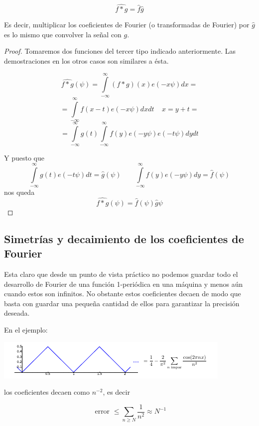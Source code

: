 \begin{prop}
	\[\widehat{f*g} = \hat{f} \hat{g}\]

	Es decir, multiplicar los coeficientes de Fourier (o transformadas de Fourier) por $\hat{g}$ es lo mismo que convolver la señal con $g$.

\end{prop}

\begin{proof}
Tomaremos dos funciones del tercer tipo indicado anteriormente. Las demostraciones en los otros casos son similares a ésta.

$$ \widehat{f*g}(\psi) = \int\limits^{\infty}_{-\infty} (f*g)(x) e(-x\psi)dx =$$
$$ = \int\limits^{\infty}_{-\infty} f(x - t) e (-x \psi) dx dt \;\;\;\; x = y + t=$$
$$ = \int\limits^{\infty}_{-\infty} g(t) \int\limits^{\infty}_{-\infty} f(y) e (-y \psi) e(-t\psi)dy dt$$

Y puesto que
$$ \int\limits^{\infty}_{-\infty} g(t) e(-t\psi) dt = \hat{g}(\psi) \;\;\;\;\;\;\; \int\limits^{\infty}_{-\infty} f(y) e (-y \psi) dy = \hat{f}(\psi) $$
nos queda
$$\widehat{f*g} (\psi) = \hat{f}(\psi) \hat{g}\psi $$

\end{proof}

\subsection{Simetrías y decaimiento de los coeficientes de Fourier}

Esta claro que desde un punto de vista práctico no podemos guardar todo el desarrollo de Fourier de una función 1-periódica en una máquina y menos aún cuando estos son infinitos. No obstante estos coeficientes decaen de modo que basta con guardar una pequeña cantidad de ellos para garantizar la precisión deseada.

En el ejemplo:

\begin{center}
\includegraphics[width=\linewidth]{img/ejemplo_decaimiento.png}
\end{center}

los coeficientes decaen como $n^{-2}$, es decir

\[ \text{ error } \leq \sum_{n \geq N} \frac{1}{n^2}  ≈ N^{-1} \]

